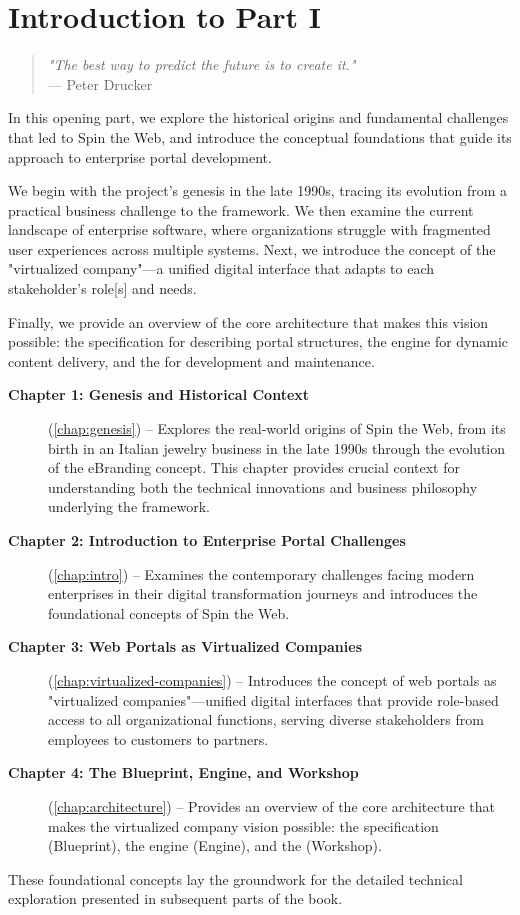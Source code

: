 
\chapter*{Introduction to Part I}
\label{part:foundations}

\begin{quote}
\textit{"The best way to predict the future is to create it."} \\
— Peter Drucker
\end{quote}

In this opening part, we explore the historical origins and fundamental challenges that led to Spin the Web, and introduce the conceptual foundations that guide its approach to enterprise portal development.

We begin with the project's genesis in the late 1990s, tracing its evolution from a practical business challenge to the framework. We then examine the current landscape of enterprise software, where organizations struggle with fragmented user experiences across multiple systems. Next, we introduce the concept of the "virtualized company"—a unified digital interface that adapts to each stakeholder's role[s] and needs.

Finally, we provide an overview of the core architecture that makes this vision possible: the \wbdl{} specification for describing portal structures, the \webspinner{} engine for dynamic content delivery, and the \studio{} for development and maintenance.

\begin{description}
\item[\textbf{Chapter 1: Genesis and Historical Context}] (\cref{chap:genesis}) -- Explores the real-world origins of Spin the Web, from its birth in an Italian jewelry business in the late 1990s through the evolution of the eBranding concept. This chapter provides crucial context for understanding both the technical innovations and business philosophy underlying the framework.

\item[\textbf{Chapter 2: Introduction to Enterprise Portal Challenges}] (\cref{chap:intro}) -- Examines the contemporary challenges facing modern enterprises in their digital transformation journeys and introduces the foundational concepts of Spin the Web.

\item[\textbf{Chapter 3: Web Portals as Virtualized Companies}] (\cref{chap:virtualized-companies}) -- Introduces the concept of web portals as "virtualized companies"—unified digital interfaces that provide role-based access to all organizational functions, serving diverse stakeholders from employees to customers to partners.

\item[\textbf{Chapter 4: The Blueprint, Engine, and Workshop}] (\cref{chap:architecture}) -- Provides an overview of the core architecture that makes the virtualized company vision possible: the \wbdl{} specification (Blueprint), the \webspinner{} engine (Engine), and the \studio{} (Workshop).
\end{description}

These foundational concepts lay the groundwork for the detailed technical exploration presented in subsequent parts of the book.
